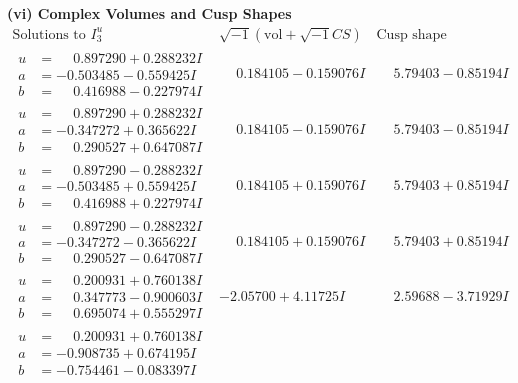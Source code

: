 \documentclass[1p]{elsarticle_modified}
\theoremstyle{definition}
\newcommand{\I}{\sqrt{-1}}
\begin{document}
\newpage\flushleft \textbf{(vi) Complex Volumes and Cusp Shapes}
$$\begin{array}{c|c|c}  
\text{Solutions to }I^u_{3}& \I (\text{vol} + \sqrt{-1}CS) & \text{Cusp shape}\\
 \hline 
\begin{aligned}
u &= \phantom{-}0.897290 + 0.288232 I \\
a &= -0.503485 - 0.559425 I \\
b &= \phantom{-}0.416988 - 0.227974 I\end{aligned}
 & \phantom{-}0.184105 - 0.159076 I & \phantom{-}5.79403 - 0.85194 I \\ \hline\begin{aligned}
u &= \phantom{-}0.897290 + 0.288232 I \\
a &= -0.347272 + 0.365622 I \\
b &= \phantom{-}0.290527 + 0.647087 I\end{aligned}
 & \phantom{-}0.184105 - 0.159076 I & \phantom{-}5.79403 - 0.85194 I \\ \hline\begin{aligned}
u &= \phantom{-}0.897290 - 0.288232 I \\
a &= -0.503485 + 0.559425 I \\
b &= \phantom{-}0.416988 + 0.227974 I\end{aligned}
 & \phantom{-}0.184105 + 0.159076 I & \phantom{-}5.79403 + 0.85194 I \\ \hline\begin{aligned}
u &= \phantom{-}0.897290 - 0.288232 I \\
a &= -0.347272 - 0.365622 I \\
b &= \phantom{-}0.290527 - 0.647087 I\end{aligned}
 & \phantom{-}0.184105 + 0.159076 I & \phantom{-}5.79403 + 0.85194 I \\ \hline\begin{aligned}
u &= \phantom{-}0.200931 + 0.760138 I \\
a &= \phantom{-}0.347773 - 0.900603 I \\
b &= \phantom{-}0.695074 + 0.555297 I\end{aligned}
 & -2.05700 + 4.11725 I & \phantom{-}2.59688 - 3.71929 I \\ \hline\begin{aligned}
u &= \phantom{-}0.200931 + 0.760138 I \\
a &= -0.908735 + 0.674195 I \\
b &= -0.754461 - 0.083397 I\end{aligned}

\end{array}$$
\end{document}
